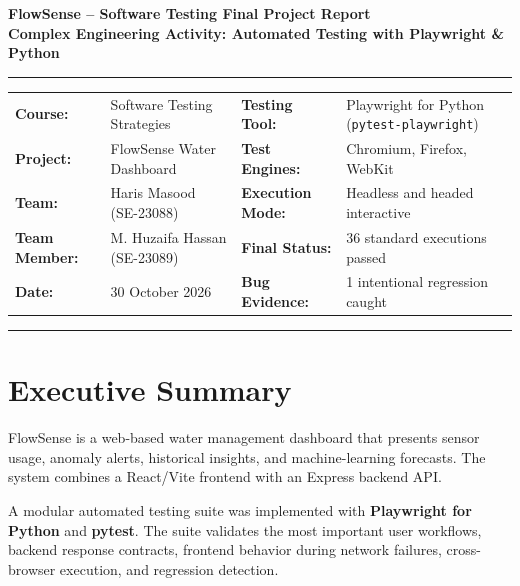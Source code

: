 \documentclass[11pt,a4paper]{article}
\begin{document}
\begin{center}
    {\LARGE\bfseries\color{primaryblue} FlowSense -- Software Testing Final Project Report}\\[6pt]
    {\large\bfseries Complex Engineering Activity: Automated Testing with Playwright \& Python}\\[12pt]
    \rule{\linewidth}{1pt}
\end{center}

\vspace{-4pt}
\noindent
\begin{tabularx}{\linewidth}{@{}lX lX@{}}
    \textbf{Course:} & Software Testing Strategies & \textbf{Testing Tool:} & Playwright for Python (\texttt{pytest-playwright}) \\
    \textbf{Project:} & FlowSense Water Dashboard & \textbf{Test Engines:} & Chromium, Firefox, WebKit \\
    \textbf{Team:} & Haris Masood (SE-23088) & \textbf{Execution Mode:} & Headless and headed interactive \\
    \textbf{Team Member:} & M. Huzaifa Hassan (SE-23089) & \textbf{Final Status:} & 36 standard executions passed \\
    \textbf{Date:} & 30 October 2026 & \textbf{Bug Evidence:} & 1 intentional regression caught \\
\end{tabularx}

\vspace{10pt}
\hrule
\vspace{14pt}

\section{Executive Summary}

FlowSense is a web-based water management dashboard that presents sensor usage, anomaly alerts, historical insights, and machine-learning forecasts. The system combines a React/Vite frontend with an Express backend API.

A modular automated testing suite was implemented with \textbf{Playwright for Python} and \textbf{pytest}. The suite validates the most important user workflows, backend response contracts, frontend behavior during network failures, cross-browser execution, and regression detection.
\end{document}
